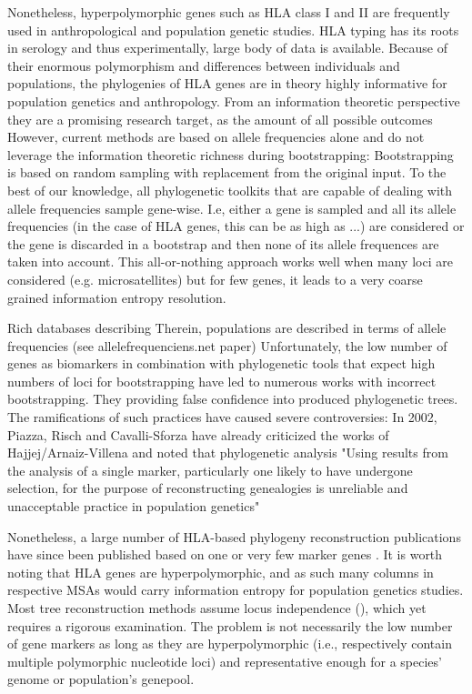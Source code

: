 \documentclass{article}
\begin{document}
Nonetheless, hyperpolymorphic genes such as HLA class I and II are frequently used in anthropological and population genetic studies.
HLA typing has its roots in serology and thus experimentally, large body of data is available.
Because of their enormous polymorphism and differences between individuals and populations, the phylogenies of HLA genes
are in theory highly informative for population genetics and anthropology. From an information theoretic perspective
they are a promising research target, as the amount of all possible outcomes
However, current methods are based on allele frequencies alone and do not leverage the information theoretic richness during bootstrapping:
Bootstrapping is based on random sampling with replacement from the original input. To the best of our knowledge,
all phylogenetic toolkits that are capable of dealing with allele frequencies sample gene-wise.
I.e, either a gene is sampled and all its allele frequencies (in the case of HLA genes, this can be as high as ...)
are considered or the gene is discarded in a bootstrap and then none of its allele frequences are taken into
account. This all-or-nothing approach works well when many loci are considered (e.g. microsatellites)
but for few genes, it leads to a very coarse grained information entropy resolution.

Rich databases describing
Therein, populations are described in terms of allele frequencies (see allelefrequenciens.net paper)
Unfortunately, the low number of genes as biomarkers in combination with phylogenetic tools that expect high numbers of
loci for bootstrapping have led to numerous works with incorrect bootstrapping.
They providing false confidence into produced phylogenetic trees. The ramifications of such practices have caused
severe controversies:
In 2002, Piazza, Risch and Cavalli-Sforza have already criticized the works of Hajjej/Arnaiz-Villena and noted that
phylogenetic analysis  "Using results from the analysis of a single marker, particularly one likely to
have undergone selection, for the purpose of reconstructing genealogies is unreliable and unacceptable
practice in population genetics"

Nonetheless, a large number of HLA-based phylogeny reconstruction publications have since been  published based on one
or very few marker genes \cite{}.
It is worth noting that HLA genes are hyperpolymorphic, and as such many columns in respective MSAs would carry
information entropy for population genetics studies. Most tree reconstruction methods assume locus independence
(\cite{Efron1996Nov}), which yet requires a rigorous examination. The problem is not necessarily the low number of
gene markers as long as they are hyperpolymorphic (i.e., respectively contain multiple polymorphic nucleotide loci)
and representative enough for a species' genome or population's genepool.
\end{document}
